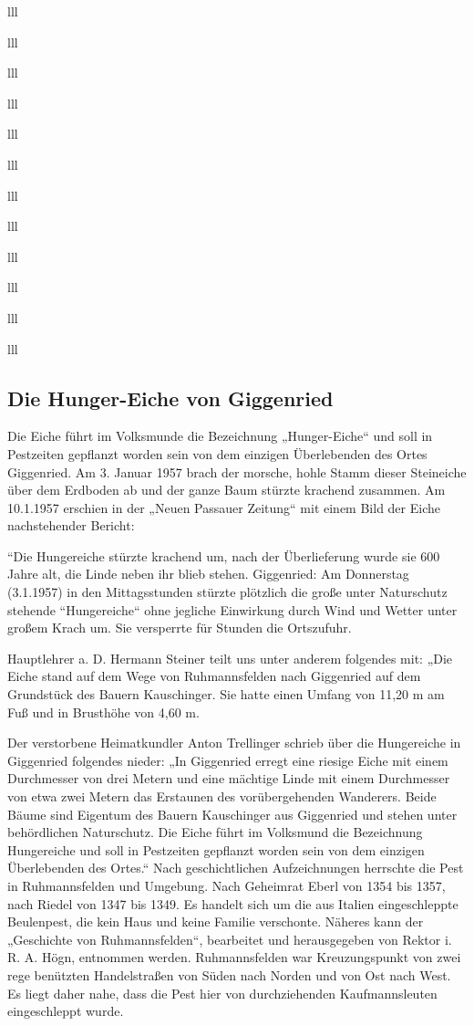 \documentclass[12pt,a4pager]{book}
\begin{document}
\begin{tabuluar}{lll}
\begin{tabuluar}{lll}
\begin{tabuluar}{lll}
\begin{tabuluar}{lll}
\begin{tabuluar}{lll}
\begin{tabuluar}{lll}
\begin{tabuluar}{lll}
\begin{tabuluar}{lll}
\begin{tabuluar}{lll}
\begin{tabuluar}{lll}
\begin{tabuluar}{lll}
\begin{tabuluar}{lll}
\subsection{Die Hunger-Eiche von Giggenried}

Die Eiche führt im Volksmunde die Bezeichnung „Hunger-Eiche“ und soll in
Pestzeiten gepflanzt worden sein von dem einzigen Überlebenden des Ortes
Giggenried. Am 3. Januar 1957 brach der morsche, hohle Stamm dieser Steineiche
über dem Erdboden ab und der ganze Baum stürzte krachend zusammen. Am 10.1.1957
erschien in der „Neuen Passauer Zeitung“ mit einem Bild der Eiche nachstehender
Bericht:

“Die Hungereiche stürzte krachend um, nach der Überlieferung wurde sie 600 Jahre
alt, die Linde neben ihr blieb stehen. Giggenried: Am Donnerstag (3.1.1957) in
den Mittagsstunden stürzte plötzlich die große unter Naturschutz stehende
“Hungereiche“ ohne jegliche Einwirkung durch Wind und Wetter unter großem Krach
um. Sie versperrte für Stunden die Ortszufuhr.

Hauptlehrer a. D. Hermann Steiner teilt uns unter anderem folgendes mit: „Die
Eiche stand auf dem Wege von Ruhmannsfelden nach Giggenried auf dem Grundstück
des Bauern Kauschinger. Sie hatte einen Umfang von 11,20 m am Fuß und in
Brusthöhe von 4,60 m.

Der verstorbene Heimatkundler Anton Trellinger schrieb über die Hungereiche in
Giggenried folgendes nieder: „In Giggenried erregt eine riesige Eiche mit einem
Durchmesser von drei Metern und eine mächtige Linde mit einem Durchmesser von
etwa zwei Metern das Erstaunen des vorübergehenden Wanderers. Beide Bäume sind
Eigentum des Bauern Kauschinger aus Giggenried und stehen unter behördlichen
Naturschutz. Die Eiche führt im Volksmund die Bezeichnung Hungereiche und soll
in Pestzeiten gepflanzt worden sein von dem einzigen Überlebenden des Ortes.“
Nach geschichtlichen Aufzeichnungen herrschte die Pest in Ruhmannsfelden und
Umgebung. Nach Geheimrat Eberl von 1354 bis 1357, nach Riedel     von 1347 bis
1349. Es handelt sich um die aus Italien eingeschleppte Beulenpest, die kein
Haus und keine Familie verschonte. Näheres kann der „Geschichte von
Ruhmannsfelden“, bearbeitet und herausgegeben von Rektor i. R. A. Högn,
entnommen werden. Ruhmannsfelden war Kreuzungspunkt von zwei rege benützten
Handelstraßen von Süden nach Norden und von Ost nach West. Es liegt daher nahe,
dass die Pest hier von durchziehenden Kaufmannsleuten eingeschleppt wurde.


\end{tabuluar}
\end{tabuluar}
\end{tabuluar}
\end{tabuluar}
\end{tabuluar}
\end{tabuluar}
\end{tabuluar}
\end{tabuluar}
\end{tabuluar}
\end{tabuluar}
\end{tabuluar}
\end{tabuluar}
\end{document}
